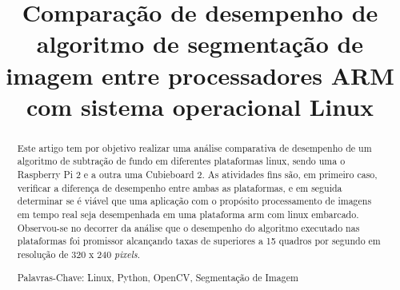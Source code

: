 \documentclass[conference]{IEEEtran}
\begin{document}
%
\title{Comparação de desempenho de algoritmo de segmentação de imagem entre processadores ARM com sistema operacional Linux}


\author{

}

\maketitle

\begin{abstract}
Este artigo tem por objetivo realizar uma análise comparativa de desempenho de um algoritmo de subtração de fundo em diferentes plataformas linux, sendo uma o Raspberry Pi 2 e a outra uma Cubieboard 2. As atividades fins são, em primeiro caso, verificar a diferença de desempenho entre ambas as plataformas, e em seguida determinar se é viável que uma aplicação com o propósito processamento de imagens em tempo real seja desempenhada em uma plataforma arm com linux embarcado. Observou-se no decorrer da análise que o desempenho do algoritmo executado nas plataformas foi promissor alcançando taxas de superiores a 15 quadros por segundo em resolução de 320 x 240 \textit{pixels}.

Palavras-Chave: Linux, Python, OpenCV, Segmentação de Imagem
\end{abstract}
\end{document}
